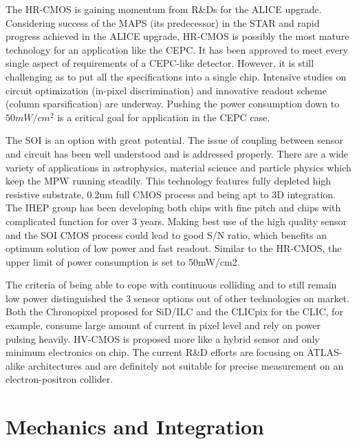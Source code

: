 The HR-CMOS is gaining momentum from R\&Ds for the ALICE upgrade. Considering success of the MAPS (its predecessor) in the STAR and rapid progress achieved in the ALICE upgrade, HR-CMOS is possibly the most mature technology for an application like the CEPC. It has been approved to meet every single aspect of requirements of a CEPC-like detector. However, it is still challenging as to put all the specifications into a single chip. Intensive studies on circuit optimization (in-pixel discrimination) and innovative readout scheme (column sparsification) are underway. Pushing the power consumption down to $50mW/cm^2$ is a critical goal for application in the CEPC case.


The SOI is an option with great potential. The issue of coupling between sensor and circuit has been well understood and is addressed properly. There are a wide variety of applications in astrophysics\cite{nakashima2013development}, material science\cite{hatsui2013direct} and particle physics\cite{ONO2013266} which keep the MPW running steadily. This technology features fully depleted high resistive substrate, 0.2um full CMOS process and being apt to 3D integration. The IHEP group has been developing both chips with fine pitch and chips with complicated function for over 3 years. Making best use of the high quality sensor and the SOI CMOS process could lead to good S/N ratio, which benefits an optimum solution of low power and fast readout. Similar to the HR-CMOS, the upper limit of power consumption is set to 50mW/cm2.


The criteria of being able to cope with continuous colliding and to still remain low power distinguished the 3 sensor options out of other technologies on market. Both the Chronopixel proposed for SiD/ILC and the CLICpix for the CLIC, for example, consume large amount of current in pixel level and rely on power pulsing heavily. HV-CMOS\cite{peric2012active} is proposed more like a hybrid sensor and only minimum electronics on chip. The current R\&D efforts are focusing on ATLAS-alike architectures and are definitely not suitable for precise measurement on an electron-positron collider.

\section{Mechanics and Integration}

